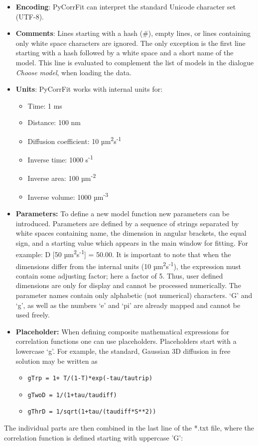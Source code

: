 \begin{itemize}
\item \textbf{Encoding}: PyCorrFit can interpret the standard Unicode character set (UTF-8).
\item \textbf{Comments}: Lines starting with a hash (\#), empty lines, or lines containing only white space characters are ignored. The only exception is the first line starting with a hash followed by a white space and a short name of the model. This line is evaluated to complement the list of models in the dialogue\textit{ Choose }\textit{model}, when loading the data.
\item \textbf{Units}: PyCorrFit works with internal units for:

\begin{itemize}
\item Time: 1 ms
\item Distance: 100 nm
\item Diffusion coefficient: 10 µm\textsuperscript{2}s\textsuperscript{{}-1} 
\item Inverse time: 1000 s\textsuperscript{{}-1} 
\item Inverse area: 100 µm\textsuperscript{{}-2} 
\item Inverse volume: 1000 µm\textsuperscript{{}-3} 
\end{itemize}
\item \textbf{Parameters:} To define a new model function new parameters can be introduced. Parameters are defined by a sequence of strings separated by white spaces containing name, the dimension in angular brackets, the equal sign, and a starting value which appears in the main window for fitting. For example: D [50 µm\textsuperscript{2}s\textsuperscript{{}-1}] = 50.00. It is important to note that when the dimensions differ from the internal units (10 µm\textsuperscript{2}s\textsuperscript{{}-1}), the expression must contain some adjusting factor; here a factor of 5. Thus, user defined dimensions are only for display and cannot be processed numerically. The parameter names contain only alphabetic (not numerical) characters. ‘G’ and ‘g’, as well as the numbers ‘e’ and ‘pi’ are already mapped and cannot be used freely.
\item \textbf{Placeholder:} When defining composite mathematical expressions for correlation functions one can use placeholders. Placeholders start with a lowercase ‘g’. For example, the standard, Gaussian 3D diffusion in free solution may be written as

\begin{itemize}
\item \texttt{gTrp = 1+ T/(1-T)*exp(-tau/tautrip)}
\item \texttt{gTwoD = 1/(1+tau/taudiff)}
\item \texttt{gThrD = 1/sqrt(1+tau/(taudiff*S**2))}
\end{itemize}
\end{itemize}
The individual parts are then combined in the last line of the *.txt file, where the correlation function is defined starting with uppercase ’G’:

